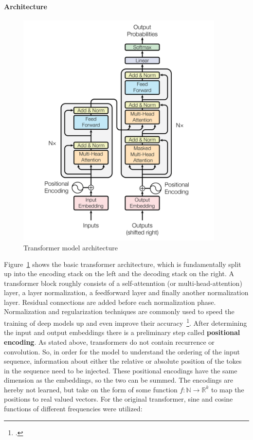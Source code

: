 \paragraph{Architecture}
\begin{figure}[h]
  	\includegraphics[height=12cm]{img/transformer}
  	\caption{Transformer model architecture}
	\label{fig:transformer}
\end{figure}
Figure~\ref{fig:transformer} shows the basic transformer architecture, which is fundamentally split up into the encoding stack on the left and the decoding stack on the right. A transformer block roughly consists of a self-attenntion (or multi-head-attention) layer, a layer normalization, a feedforward layer and finally another normalization layer. Residual connections are added before each normalization phase. Normalization and regularization techniques are commonly used to speed the training of deep models up and even improve their accuracy~\footcite{DBLP:journals/corr/abs-1903-00925}. After determining the input and output embeddings there is a preliminary step called \textbf{positional encoding}. As stated above, transformers do not contain recurrence or convolution. So, in order for the model to understand the ordering of the input sequence, information about either the relative or absolute position of the tokes in the sequence need to be injected. These positional encodings have the same dimension as the embeddings, so the two can be summed. The encodings are hereby not learned, but take on the form of some function $ f: \mathbb{N} \rightarrow \mathbb{R}^k $ to map the positions to real valued vectors. For the original transformer, sine and cosine functions of different frequencies were utilized:
